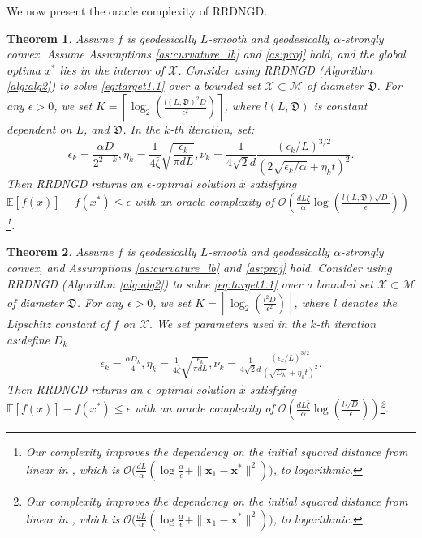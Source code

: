 \documentclass{article}
\theoremstyle{plain}
\newtheorem{theorem}{Theorem}[section]
\theoremstyle{definition}
\theoremstyle{remark}
\begin{document}
We now present the oracle complexity of RRDNGD. 
\begin{theorem}\label{thm:strong_convexity_complexity}
Assume $f$ is geodesically $L$-smooth and geodesically $\alpha$-strongly convex. Assume Assumptions \ref{as:curvature_lb} and \ref{as:proj} hold, and the global optima $x^*$ lies in the interior of $\mathcal{X}$. Consider using RRDNGD (Algorithm \ref{alg:alg2}) to solve \eqref{eq:target1.1} over a bounded set $\mathcal{X}\subset\mathcal{M}$ of diameter $\mathfrak{D}$. For any $\epsilon>0$, we set $K = \left\lceil \log_2\left( \frac{l(L,\mathfrak{D})^2 D}{\epsilon^2} \right) \right\rceil$, where $l(L,\mathfrak{D})$ is constant dependent on $L$, and $\mathfrak{D}$. In the $k$-th iteration, set:
\[    \epsilon_k = \frac{\alpha D}{2^{2-k}}, 
    \eta_k = \frac{1}{4\bar{\zeta}}\sqrt{\frac{\epsilon_k}{\pi dL}}, 
    \nu_k = \frac{1}{4\sqrt{2} d}\frac{(\epsilon_k/L)^{3/2}}{(2\sqrt{\epsilon_{k}/\alpha}+\eta_k t)^2}.
\]
Then RRDNGD returns an $\epsilon$-optimal solution $\hat{x}$ satisfying $\mathbb{E}[f(\hat{x})] - f(x^*) \leq \epsilon$
with an oracle complexity of
$\mathcal{O}\left( \frac{dL\bar{\zeta}}{\alpha} \log\left( \frac{l(L,\mathfrak{D}) \sqrt{D}}{\epsilon} \right) \right)$\footnote{Our complexity improves the dependency on the initial squared distance from linear in \citep{pmlr-v139-saha21b}, which is $\mathcal{O}\big( \frac{dL}{\alpha} ( \log \frac{\alpha}{\epsilon} + \|\mathbf{x}_1 - \mathbf{x}^*\|^2 ) \big)$, to logarithmic.}.
\end{theorem}

\iffalse
\begin{theorem}\label{thm:strong_convexity_complexity}
Assume $f$ is geodesically $L$-smooth and geodesically $\alpha$-strongly convex, and Assumptions \ref{as:curvature_lb} and \ref{as:proj} hold. Consider using RRDNGD (Algorithm \ref{alg:alg2}) to solve \eqref{eq:target1.1} over a bounded set $\mathcal{X}\subset\mathcal{M}$ of diameter $\mathfrak{D}$. For any $\epsilon>0$, we set $K = \left\lceil \log_2\left( \frac{l^2 D}{\epsilon^2} \right) \right\rceil$, where $l$ denotes the Lipschitz constant of $f$ on $\mathcal{X}$. We set parameters used in the $k$-th iteration as:{\color{red}define $D_k$}
\begin{align}
    \epsilon_k = \frac{\alpha D_k}{4},  
    \eta_k = \frac{1}{4\bar{\zeta}}\sqrt{\frac{\epsilon_k}{\pi dL}},  
    \nu_k = \frac{1}{4\sqrt{2} d}\frac{(\epsilon_k/L)^{3/2}}{(\sqrt{D_{k}}+\eta_k t)^2}.
\end{align}
Then RRDNGD returns an $\epsilon$-optimal solution $\hat{x}$ satisfying $\mathbb{E}[f(\hat{x})] - f(x^*) \leq \epsilon$
with an oracle complexity of
$\mathcal{O}\left( \frac{dL\bar{\zeta}}{\alpha} \log\left( \frac{l \sqrt{D}}{\epsilon} \right) \right)$\footnote{Our complexity improves the dependency on the initial squared distance from linear in \citep{pmlr-v139-saha21b}, which is $\mathcal{O}\big( \frac{dL}{\alpha} ( \log \frac{\alpha}{\epsilon} + \|\mathbf{x}_1 - \mathbf{x}^*\|^2 ) \big)$, to logarithmic.}.
\end{theorem}
\end{document}
